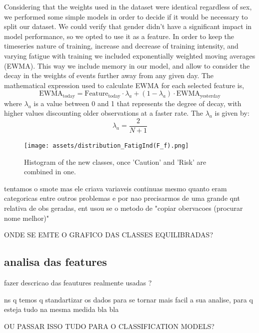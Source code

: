 \documentclass[conference]{IEEEtran}
\begin{document}
Considering that the weights used in the dataset were identical regardless of sex, we performed some simple models in order to decide if it would be necessary to split our dataset. We could verify that gender didn't have a significant impact in model performance, so we opted to use it as a feature.
In order to keep the timeseries nature of training, increase and decrease of training intensity, and varying fatigue with training we included exponentially weighted moving averages (EWMA). This way we include memory in our model, and allow to consider the decay in the weights of events further away from any given day. The mathematical expression used to calculate EWMA for each selected feature is,
\begin{equation*}
    \text{EWMA}_{\text{today}} = \text{Feature}_{\text{today}} \cdot \lambda_a + (1 - \lambda_a) \cdot \text{EWMA}_{\text{yesterday}}
\end{equation*}
where $\lambda_a$ is a value between 0 and 1 that represents the degree of decay, with higher values discounting older observations at a faster rate. The $\lambda_a$ is given by:
\begin{equation*}
    \lambda_a = \frac{2}{N + 1}
\end{equation*} 


\begin{figure}[H]
    \centering
    \texttt{[image: assets/distribution\_FatigInd(F\_f).png]}
    \caption{Histogram of the new classes, once 'Caution' and 'Risk' are combined in one.}
    \label{histClasses}
\end{figure}

tentamos o smote mas ele criava variaveis continuas mesmo quanto eram categoricas entre outros problemas e por nao precisarmos de uma grande qnt relativa de obs geradas, ent usou se o metodo de "copiar obervacoes (procurar nome melhor)"

ONDE SE EMTE O GRAFICO DAS CLASSES EQUILIBRADAS?



\subsection{analisa das features}

fazer descricao das feautures realmente usadas ?

ns q temos q standartizar os dados para se tornar mais facil a sua analise, para q esteja tudo na mesma medida bla bla

OU PASSAR ISSO TUDO PARA O CLASSIFICATION MODELS?
\end{document}
